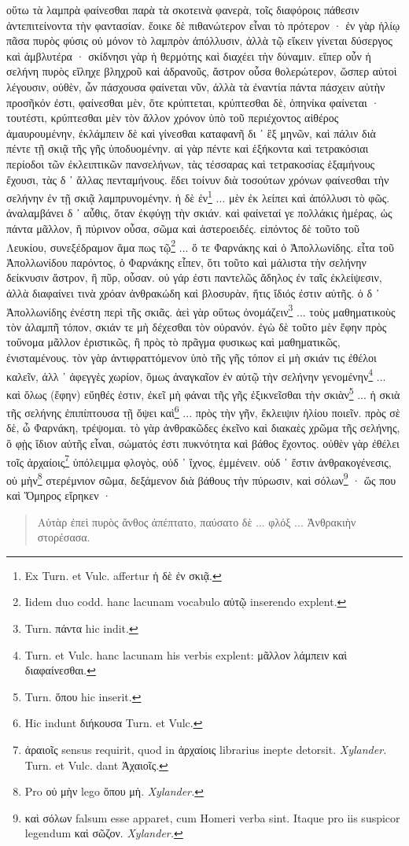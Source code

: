 \documentclass[a4paper, 11pt, oneside, polutonikogreek, german]{article}
\begin{document}
οὕτω τὰ λαμπρὰ φαίνεσθαι παρὰ τὰ σκοτεινὰ φανερὰ, τοῖς διαφόροις πάθεσιν ἀντεπιτείνοντα τὴν φαντασίαν. ἔοικε δὲ πιθανώτερον εἶναι τὸ πρότερον · ἐν γὰρ ἡλίῳ πᾶσα πυρὸς φύσις οὐ μόνον τὸ λαμπρὸν ἀπόλλυσιν, ἀλλὰ τῷ εἴκειν γίνεται δύσεργος καὶ ἀμβλυτέρα · σκίδνησι γὰρ ἡ θερμότης καὶ διαχέει τὴν δύναμιν. εἴπερ οὖν ἡ σελήνη πυρὸς εἴληχε βληχροῦ καὶ ἀδρανοῦς, ἄστρον οὖσα θολερώτερον, ὥσπερ αὐτοὶ λέγουσιν, οὐθὲν, ὧν πάσχουσα φαίνεται νῦν, ἀλλὰ τὰ ἐναντία πάντα πάσχειν αὐτὴν προσῆκόν ἐστι, φαίνεσθαι μὲν, ὅτε κρύπτεται, κρύπτεσθαι δὲ, ὁπηνίκα φαίνεται · τουτέστι, κρύπτεσθαι μὲν τὸν ἄλλον χρόνον ὑπὸ τοῦ περιέχοντος αἰθέρος ἀμαυρουμένην, ἐκλάμπειν δὲ καὶ γίνεσθαι καταφανῆ δι ᾽ ἓξ μηνῶν, καὶ πάλιν διὰ πέντε τῇ σκιᾷ τῆς γῆς ὑποδυομένην. αἱ γὰρ πέντε καὶ ἑξήκοντα καὶ τετρακόσιαι περίοδοι τῶν ἐκλειπτικῶν πανσελήνων, τὰς τέσσαρας καὶ τετρακοσίας ἑξαμήνους ἔχουσι, τὰς δ ᾽ ἄλλας πενταμήνους. ἔδει τοίνυν διὰ τοσούτων χρόνων φαίνεσθαι τὴν σελήνην ἐν τῇ σκιᾷ λαμπρυνομένην. ἡ δὲ ἐν\footnote{Ex Turn. et Vulc. affertur ἡ δὲ ἐν σκιᾷ.} ... μὲν ἐκ λείπει καὶ ἀπόλλυσι τὸ φῶς. ἀναλαμβάνει δ ᾽ αὖθις, ὅταν ἐκφύγῃ τὴν σκιάν. καὶ φαίνεταί γε πολλάκις ἡμέρας, ὡς πάντα μᾶλλον, ἢ πύρινον οὖσα, σῶμα καὶ ἀστεροειδές. εἰπόντος δὲ τοῦτο τοῦ Λευκίου, συνεξέδραμον ἅμα πως τῷ\footnote{Iidem duo codd. hanc lacunam vocabulo αὐτῷ inserendo explent.} ... ὅ τε Φαρνάκης καὶ ὁ Ἀπολλωνίδης. εἶτα τοῦ Ἀπολλωνίδου παρόντος, ὁ Φαρνάκης εἶπεν, ὅτι τοῦτο καὶ μάλιστα τὴν σελήνην δείκνυσιν ἄστρον, ἢ πῦρ, οὖσαν. οὐ γάρ ἐστι παντελῶς ἄδηλος ἐν ταῖς ἐκλείψεσιν, ἀλλὰ διαφαίνει τινὰ χρόαν ἀνθρακώδη καὶ βλοσυρὰν, ἥτις ἴδιός ἐστιν αὐτῆς. ὁ δ ᾽ Ἀπολλωνίδης ἐνέστη περὶ τῆς σκιᾶς. ἀεὶ γὰρ οὕτως ὀνομάζειν\footnote{Turn. πάντα hic indit.} ... τοὺς μαθηματικοὺς τὸν ἀλαμπῆ τόπον, σκιάν τε μὴ δέχεσθαι τὸν οὐρανόν. ἐγὼ δὲ τοῦτο μὲν ἔφην πρὸς τοὔνομα μᾶλλον ἐριστικῶς, ἢ πρὸς τὸ πρᾶγμα φυσικως καὶ μαθηματικῶς, ἐνισταμένους. τὸν γὰρ ἀντιφραττόμενον ὑπὸ τῆς γῆς τόπον εἰ μὴ σκιάν τις ἐθέλοι καλεῖν, ἀλλ ᾽ ἀφεγγὲς χωρίον, ὅμως ἀναγκαῖον ἐν αὐτῷ τὴν σελήνην γενομένην\footnote{Turn. et Vulc. hanc lacunam his verbis explent: μᾶλλον λάμπειν καὶ διαφαίνεσθαι.} ... καὶ ὅλως (ἔφην) εὔηθές ἐστιν, ἐκεῖ μὴ φάναι τῆς γῆς ἐξικνεῖσθαι τὴν σκιὰν\footnote{Turn. ὅπου hic inserit.} ... ἡ σκιὰ τῆς σελήνης ἐπιπίπτουσα τῇ ὄψει καὶ\footnote{Hic indunt διήκουσα Turn. et Vulc.} ... πρὸς τὴν γῆν, ἔκλειψιν ἡλίου ποιεῖν. πρὸς σὲ δὲ, ὦ Φαρνάκη, τρέψομαι. τὸ γὰρ ἀνθρακῶδες ἐκεῖνο καὶ διακαὲς χρῶμα τῆς σελήνης, ὃ φῂς ἴδιον αὐτῆς εἶναι, σώματός ἐστι πυκνότητα καὶ βάθος ἔχοντος. οὐθὲν γὰρ ἐθέλει τοῖς ἀρχαίοις\footnote{ἀραιοῖς sensus requirit, quod in ἀρχαίοις librarius inepte detorsit. \emph{Xylander.} Turn. et Vulc. dant Ἀχαιοῖς.} ὑπόλειμμα φλογὸς, οὐδ ᾽ ἴχνος, ἐμμένειν. οὐδ ᾽ ἔστιν ἀνθρακογένεσις, οὐ μὴν\footnote{Pro οὐ μὴν lego ὅπου μὴ. \emph{Xylander.}} στερέμνιον σῶμα, δεξάμενον διὰ βάθους τὴν πύρωσιν, καὶ σόλων\footnote{καὶ σόλων falsum esse apparet, cum Homeri verba sint. Itaque pro iis suspicor legendum καὶ σῶζον. \emph{Xylander.}} · ὥς που καὶ Ὅμηρος εἴρηκεν ·
\begin{quotation}
Αὐτὰρ ἐπεὶ πυρὸς ἄνθος ἀπέπτατο, παύσατο δὲ ... φλόξ ... Ἀνθρακιὴν στορέσασα.
\end{quotation}
\end{document}
